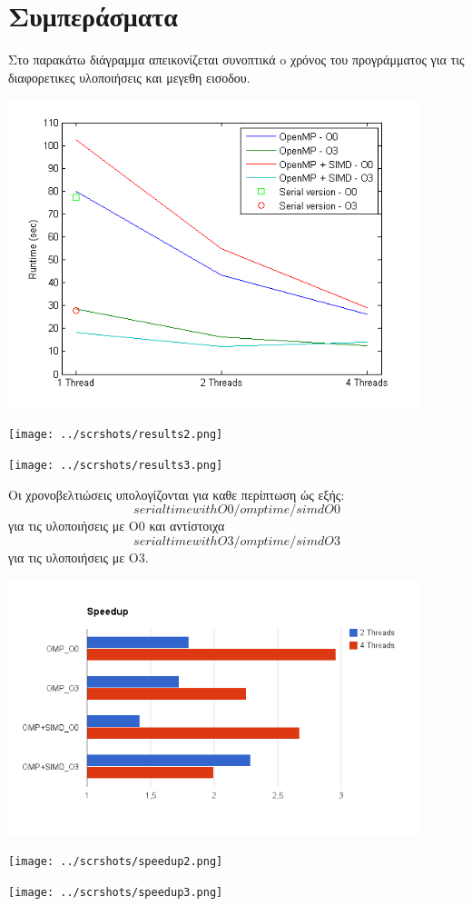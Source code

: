 \documentclass[a4paper,11pt]{article}
\begin{document}
\section{Συμπεράσματα}
Στο παρακάτω διάγραμμα απεικονίζεται συνοπτικά o χρόνος του προγράμματος για τις διαφορετικες υλοποιήσεις και μεγεθη εισοδου.
\begin{center}
\includegraphics[width=0.9\textwidth]{../scrshots/results1.png}
\end{center} 
\begin{center}
\texttt{[image: ../scrshots/results2.png]}
\end{center} 
\begin{center}
\texttt{[image: ../scrshots/results3.png]}
\end{center} 

Οι χρονοβελτιώσεις υπολογίζονται για καθε περίπτωση ώς εξής:
$$ {serial time with O0}/{omp time/simd O0} $$
για τις υλοποιήσεις με Ο0 και αντίστοιχα
$$ {serial time with O3}/{omp time/simd O3} $$
για τις υλοποιήσεις με Ο3.
\begin{center}
\includegraphics[width=0.9\textwidth]{../scrshots/speedup1.png}
\end{center} 
\begin{center}
\texttt{[image: ../scrshots/speedup2.png]}
\end{center} 
\begin{center}
\texttt{[image: ../scrshots/speedup3.png]}
\end{center} 
\end{document}
